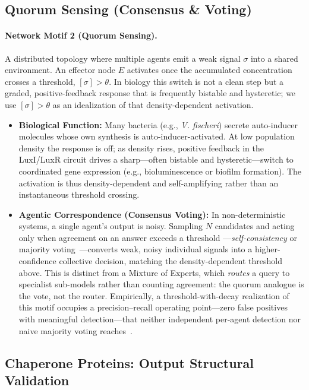 \subsection{Quorum Sensing (Consensus \& Voting)}

\paragraph{Network Motif 2 (Quorum Sensing).}
A distributed topology where multiple agents emit a weak signal $\sigma$ into a shared environment. An effector
node $E$ activates once the accumulated concentration crosses a threshold, $[\sigma] > \theta$. In biology this
switch is not a clean step but a graded, positive-feedback response that is frequently bistable and hysteretic;
we use $[\sigma] > \theta$ as an idealization of that density-dependent activation.
\begin{itemize}[leftmargin=*]
\item \textbf{Biological Function:} Many bacteria (e.g., \emph{V. fischeri}) secrete auto-inducer molecules
whose own synthesis is auto-inducer-activated. At low population density the response is off; as density rises,
positive feedback in the LuxI/LuxR circuit drives a sharp---often bistable and hysteretic---switch to
coordinated gene expression (e.g., bioluminescence or biofilm formation). The activation is thus
density-dependent and self-amplifying rather than an instantaneous threshold crossing.
\item \textbf{Agentic Correspondence (Consensus Voting):} In non-deterministic systems, a single agent's output
is noisy. Sampling $N$ candidates and acting only when agreement on an answer exceeds a threshold
---\emph{self-consistency} or majority voting~\cite{wang2022selfconsistency}---converts weak, noisy individual
signals into a higher-confidence collective decision, matching the density-dependent threshold above. This is
distinct from a Mixture of Experts, which \emph{routes} a query to specialist sub-models rather than counting
agreement: the quorum analogue is the vote, not the router. Empirically, a threshold-with-decay realization of
this motif occupies a precision--recall operating point---zero false positives with meaningful detection---that
neither independent per-agent detection nor naive majority voting reaches~\cite{banu2026benchmarks}.
\end{itemize}

\subsection{Chaperone Proteins: Output Structural Validation}

